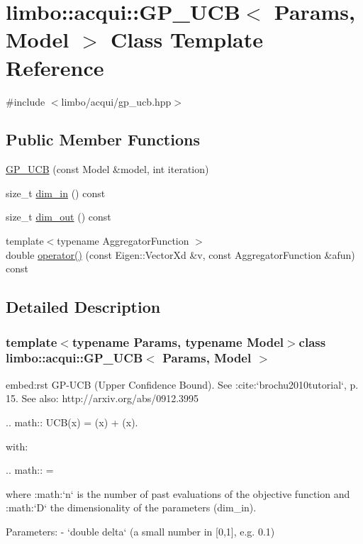 \hypertarget{classlimbo_1_1acqui_1_1_g_p___u_c_b}{}\section{limbo\+:\+:acqui\+:\+:G\+P\+\_\+\+U\+C\+B$<$ Params, Model $>$ Class Template Reference}
\label{classlimbo_1_1acqui_1_1_g_p___u_c_b}


{\ttfamily \#include $<$limbo/acqui/gp\+\_\+ucb.\+hpp$>$}

\subsection*{Public Member Functions}
\begin{DoxyCompactItemize}
\item 
\hyperlink{classlimbo_1_1acqui_1_1_g_p___u_c_b_a9846faaa39b1d1d7b039284f2c905205}{G\+P\+\_\+\+U\+C\+B} (const Model \&model, int iteration)
\item 
size\+\_\+t \hyperlink{classlimbo_1_1acqui_1_1_g_p___u_c_b_a30c58b2f857da76de61e8cf555e73d06}{dim\+\_\+in} () const 
\item 
size\+\_\+t \hyperlink{classlimbo_1_1acqui_1_1_g_p___u_c_b_abde3ddcfa0bfb16d453587832f4e78b1}{dim\+\_\+out} () const 
\item 
{\footnotesize template$<$typename Aggregator\+Function $>$ }\\double \hyperlink{classlimbo_1_1acqui_1_1_g_p___u_c_b_a810a016815ee1e2355654b3a7658d207}{operator()} (const Eigen\+::\+Vector\+Xd \&v, const Aggregator\+Function \&afun) const 
\end{DoxyCompactItemize}


\subsection{Detailed Description}
\subsubsection*{template$<$typename Params, typename Model$>$class limbo\+::acqui\+::\+G\+P\+\_\+\+U\+C\+B$<$ Params, Model $>$}

\begin{DoxyVerb}embed:rst
GP-UCB (Upper Confidence Bound). See :cite:`brochu2010tutorial`, p. 15. See also: http://arxiv.org/abs/0912.3995

.. math::
  UCB(x) = \mu(x) + \kappa \sigma(x).

with:

.. math::
  \kappa = 

where :math:`n` is the number of past evaluations of the objective function and :math:`D` the dimensionality of the parameters (dim_in).

Parameters:
  - `double delta` (a small number in [0,1], e.g. 0.1)
\end{DoxyVerb}
 

